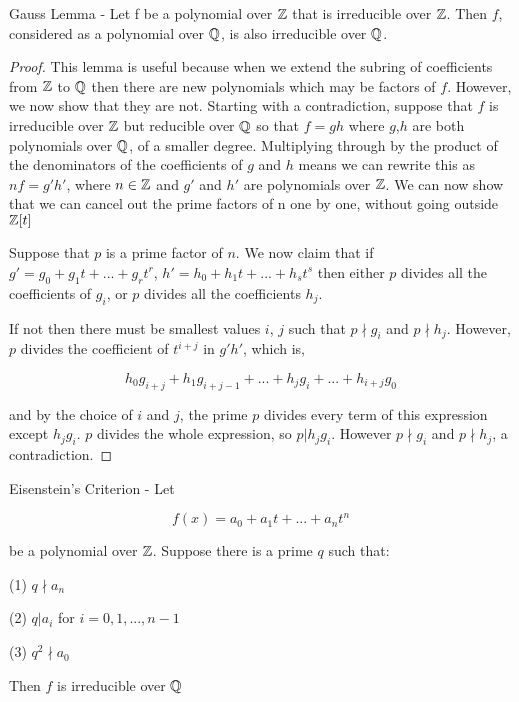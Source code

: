 \begin{theorem}
    Gauss Lemma - Let f be a polynomial over $\mathbb Z$ that is irreducible over $\mathbb Z$. Then $f$, considered as a polynomial over $\mathbb Q$, is also irreducible over $\mathbb Q$.
\end{theorem}

\begin{proof}
This lemma is useful because when we extend the subring of coefficients from $\mathbb Z$ to $\mathbb Q$ then there are new polynomials which may be factors of $f$. However, we now show that they are not. Starting with a contradiction, suppose that $f$ is irreducible over $\mathbb Z$ but reducible over $\mathbb Q$ so that $f = g h$ where $g$,$h$ are both polynomials over $\mathbb Q$, of a smaller degree. Multiplying through by the product of the denominators of the coefficients of $g$ and $h$ means we can rewrite this as $n f = g' h'$, where $n \in \mathbb Z$ and $g'$ and $h'$ are polynomials over $\mathbb Z$. We can now show that we can cancel out the prime factors of n one by one, without going outside $\mathbb Z[t]$

Suppose that $p$ is a prime factor of $n$. We now claim that if $g' = g_0 + g_1 t +...+ g_r t^r$, $h' = h_0 + h_1 t +...+ h_s t^s$ then either $p$ divides all the coefficients of $g_i$, or $p$ divides all the coefficients $h_j$.

If not then there must be smallest values $i$, $j$ such that $p \nmid g_i$ and $p \nmid h_j$. However, $p$ divides the coefficient of $t^{i+j}$ in $g' h'$, which is, 

$$
h_0 g_{i+j} + h_1 g_{i+j-1} +...+ h_j g_i +...+ h_{i+j} g_0
$$

and by the choice of $i$ and $j$, the prime $p$ divides every term of this expression except $h_j g_i$. $p$ divides the whole expression, so $p | h_j g_i$. However $p \nmid g_i$ and $p \nmid h_j$, a contradiction.
\end{proof}

\begin{theorem}
    Eisenstein's Criterion - Let
    
    $$f(x) = a_0 + a_1 t + ... + a_n t^n$$
    
    be a polynomial over $\mathbb Z$. Suppose there is a prime $q$ such that:

    (1) $q \nmid a_n$

    (2) $q | a_i$ for $i = {0, 1,..., n-1}$
    
    (3) $q^2 \nmid a_0$
    
    Then $f$ is irreducible over $\mathbb Q$
\end{theorem}

